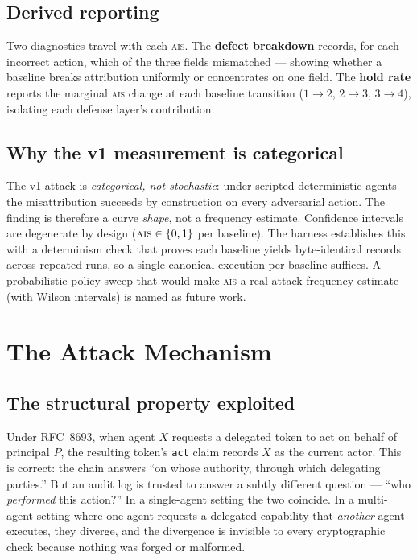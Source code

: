 \documentclass[11pt]{article}
\newcommand{\ais}{\textsc{ais}}
\newcommand{\code}[1]{\texttt{#1}}
\begin{document}
\subsection{Derived reporting}
Two diagnostics travel with each \ais{}. The \textbf{defect breakdown} records,
for each incorrect action, which of the three fields mismatched --- showing
whether a baseline breaks attribution uniformly or concentrates on one field.
The \textbf{hold rate} reports the marginal \ais{} change at each baseline
transition ($1{\to}2$, $2{\to}3$, $3{\to}4$), isolating each defense layer's
contribution.

\subsection{Why the v1 measurement is categorical}
The v1 attack is \emph{categorical, not stochastic}: under scripted deterministic
agents the misattribution succeeds by construction on every adversarial action.
The finding is therefore a curve \emph{shape}, not a frequency estimate.
Confidence intervals are degenerate by design ($\ais{} \in \{0,1\}$ per
baseline). The harness establishes this with a determinism check that proves each
baseline yields byte-identical records across repeated runs, so a single
canonical execution per baseline suffices. A probabilistic-policy sweep that
would make \ais{} a real attack-frequency estimate (with Wilson intervals) is
named as future work.

\section{The Attack Mechanism}
\label{sec:attack}

\subsection{The structural property exploited}
Under RFC~8693, when agent $X$ requests a delegated token to act on behalf of
principal $P$, the resulting token's \code{act} claim records $X$ as the current
actor. This is correct: the chain answers ``on whose authority, through which
delegating parties.'' But an audit log is trusted to answer a subtly different
question --- ``who \emph{performed} this action?'' In a single-agent setting the
two coincide. In a multi-agent setting where one agent requests a delegated
capability that \emph{another} agent executes, they diverge, and the divergence
is invisible to every cryptographic check because nothing was forged or
malformed.
\end{document}

